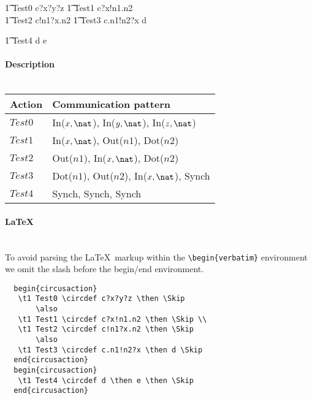 \documentclass{article}
\begin{document}
\begin{circusaction}
   \t1 Test0 \circdef c?x?y?z \then \Skip
   \also
   \t1 Test1 \circdef c?x!n1.n2 \then \Skip \\
   \t1 Test2 \circdef c!n1?x.n2 \then \Skip
   \also
   \t1 Test3 \circdef c.n1!n2?x \then d \Skip
\end{circusaction}

\begin{circusaction}
   \t1 Test4 \circdef d \then e \then \Skip
\end{circusaction}

\paragraph{Description \\ \\}

\vspace{2pt}
\begin{tabular}{l|l}
   \hline
   Action   & Communication pattern \\
   \hline
   $Test0$  & In($x, \nat$), In($y, \nat$), In($z, \nat$) \\
   \hline
   $Test1$  & In($x, \nat$), Out($n1$), Dot($n2$) \\
   \hline
   $Test2$  & Out($n1$), In($x, \nat$), Dot($n2$) \\
   \hline
   $Test3$  & Dot($n1$), Out($n2$), In($x, \nat$), Synch \\
   \hline
   $Test4$  & Synch, Synch, Synch \\
   \hline
\end{tabular}

\paragraph{\LaTeX\\ \\}

\noindent To avoid parsing the \LaTeX\ markup within the \verb'\begin{verbatim}'
environment we omit the slash before the begin/end environment.

\begin{verbatim}
  begin{circusaction}
   \t1 Test0 \circdef c?x?y?z \then \Skip
       \also
   \t1 Test1 \circdef c?x!n1.n2 \then \Skip \\
   \t1 Test2 \circdef c!n1?x.n2 \then \Skip
       \also
   \t1 Test3 \circdef c.n1!n2?x \then d \Skip
  end{circusaction}
  begin{circusaction}
   \t1 Test4 \circdef d \then e \then \Skip
  end{circusaction}
\end{verbatim}
\end{document}
